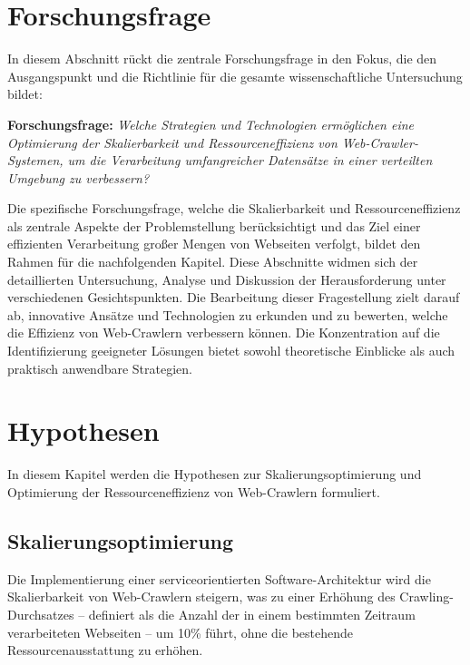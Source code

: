 \section{Forschungsfrage}\label{sec:rq}
In diesem Abschnitt rückt die zentrale Forschungsfrage in den Fokus, die den Ausgangspunkt und die Richtlinie für die gesamte wissenschaftliche Untersuchung bildet:\newline

\textbf{Forschungsfrage:}\newline
\textit{Welche Strategien und Technologien ermöglichen eine Optimierung der Skalierbarkeit und Ressourceneffizienz von Web-Crawler-Systemen, um die Verarbeitung umfangreicher Datensätze in einer verteilten Umgebung zu verbessern?}\newline

Die spezifische Forschungsfrage, welche die Skalierbarkeit und Ressourceneffizienz als zentrale Aspekte der Problemstellung berücksichtigt und das Ziel einer effizienten Verarbeitung großer Mengen von Webseiten verfolgt, bildet den Rahmen für die nachfolgenden Kapitel. Diese Abschnitte widmen sich der detaillierten Untersuchung, Analyse und Diskussion der Herausforderung unter verschiedenen Gesichtspunkten. Die Bearbeitung dieser Fragestellung zielt darauf ab, innovative Ansätze und Technologien zu erkunden und zu bewerten, welche die Effizienz von Web-Crawlern verbessern können. Die Konzentration auf die Identifizierung geeigneter Lösungen bietet sowohl theoretische Einblicke als auch praktisch anwendbare Strategien.

\section{Hypothesen}\label{sec:hypothesis}
In diesem Kapitel werden die Hypothesen zur Skalierungsoptimierung und Optimierung der Ressourceneffizienz von Web-Crawlern formuliert. 
\subsection{Skalierungsoptimierung} \label{subsec:hypothesis:scalability}

Die Implementierung einer serviceorientierten Software-Architektur wird die Skalierbarkeit von Web-Crawlern steigern, was zu einer Erhöhung des Crawling-Durchsatzes – definiert als die Anzahl der in einem bestimmten Zeitraum verarbeiteten Webseiten – um 10\% führt, ohne die bestehende Ressourcenausstattung zu erhöhen.

